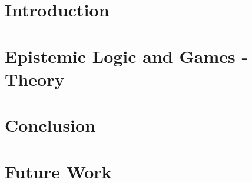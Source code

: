 \documentclass[a4paper,11pt]{article}
\author{Andreas David Lauritzen, s134849 \and%
        Christian Hildebrand Grevil, s093434 \and%
       Patrick Kasting, s124313}
\begin{document}

\pagebreak

\tableofcontents
\pagebreak

\section{Introduction}


\section{Epistemic Logic and Games - Theory}


\section{Conclusion}


\section{Future Work}

\end{document}
